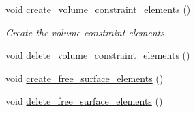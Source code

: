 \begin{DoxyCompactItemize}
\item 
void \hyperlink{classRefineableRotatingCylinderProblem_a2de094b437cba9e9b71dca0afe587d65}{create\+\_\+volume\+\_\+constraint\+\_\+elements} ()
\begin{DoxyCompactList}\small\item\em Create the volume constraint elements. \end{DoxyCompactList}\item 
void \hyperlink{classRefineableRotatingCylinderProblem_a37cc1af7c83c5c1b7ae57f7f434be2f1}{delete\+\_\+volume\+\_\+constraint\+\_\+elements} ()
\item 
void \hyperlink{classRefineableRotatingCylinderProblem_a57623d36f2c97d300215c00ac917d449}{create\+\_\+free\+\_\+surface\+\_\+elements} ()
\item 
void \hyperlink{classRefineableRotatingCylinderProblem_ada026864153cf9954011bcea592cc5b7}{delete\+\_\+free\+\_\+surface\+\_\+elements} ()
\end{DoxyCompactItemize}
